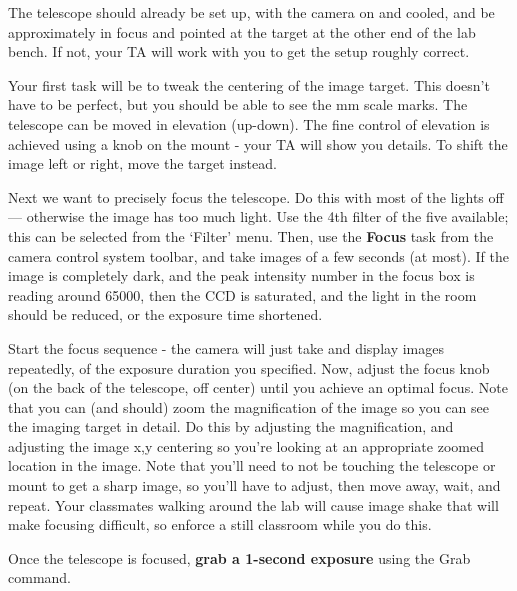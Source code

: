\begin{steps}
	\item The telescope should already be set up, with the camera on and cooled, and be approximately
	in focus and pointed at the target at the other end of the lab bench. If not, your TA will
	work with you to get the setup roughly correct.
	
	\item Your first task will be to tweak the centering of the image target. This doesn’t have to be
	perfect, but you should be able to see the mm scale marks. The telescope can be moved in elevation (up-down). The fine control of elevation is achieved using a knob on the mount - your TA will show you details. To shift the image left or right, move the target instead.
	
	\item Next we want to precisely focus the telescope. Do this with most of the lights off --- otherwise
	the image has too much light. Use the 4th filter of the five available; this can be selected
	from the ‘Filter’ menu. Then, use the \textbf{Focus} task from the camera control system toolbar,
	and take images of a few seconds (at most). If the image is completely dark, and the peak intensity number in the focus box is reading around 65000, then the CCD is saturated, and the light in the room should be reduced, or the exposure time shortened.
	
	\item Start the focus sequence - the camera will just
	take and display images repeatedly, of the exposure duration you specified. Now, adjust
	the focus knob (on the back of the telescope, off center) until you achieve an optimal focus.
	Note that you can (and should) zoom the magnification of the image so you can see the
	imaging target in detail. Do this by adjusting the magnification, and adjusting the image
	x,y centering so you’re looking at an appropriate zoomed location in the image. Note that
	you’ll need to not be touching the telescope or mount to get a sharp image, so you’ll
	have to adjust, then move away, wait, and repeat. Your classmates walking around the lab
	will cause image shake that will make focusing difficult, so enforce a still classroom while
	you do this.

	\item Once the telescope is focused, \textbf{grab a 1-second exposure} using the Grab command.
	
	

\end{steps}
